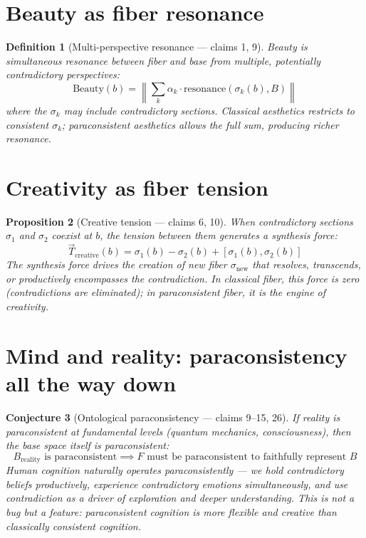 \documentclass[11pt,a4paper]{article}
\newtheorem{definition}{Definition}[section]
\newtheorem{proposition}[definition]{Proposition}
\newtheorem{conjecture}[definition]{Conjecture}
\begin{document}
\section{Beauty as fiber resonance}

\begin{definition}[Multi-perspective resonance --- claims 1, 9]
\emph{Beauty} is simultaneous resonance between fiber and base from
multiple, potentially contradictory perspectives:
\[
  \text{Beauty}(b) = \left\|\sum_k \alpha_k \cdot
    \text{resonance}(\sigma_k(b), B)\right\|
\]
where the $\sigma_k$ may include contradictory sections. Classical
aesthetics restricts to consistent $\sigma_k$; paraconsistent aesthetics
allows the full sum, producing richer resonance.
\end{definition}

\section{Creativity as fiber tension}

\begin{proposition}[Creative tension --- claims 6, 10]
\label{prop:creative}
When contradictory sections $\sigma_1$ and $\sigma_2$ coexist at $b$,
the tension between them generates a synthesis force:
\[
  \vec{T}_{\text{creative}}(b) = \sigma_1(b) - \sigma_2(b) +
    [\sigma_1(b), \sigma_2(b)]
\]
The synthesis force drives the creation of new fiber $\sigma_{\text{new}}$
that resolves, transcends, or productively encompasses the contradiction.
In classical fiber, this force is zero (contradictions are eliminated);
in paraconsistent fiber, it is the engine of creativity.
\end{proposition}


\section{Mind and reality: paraconsistency all the way down}

\begin{conjecture}[Ontological paraconsistency --- claims 9--15, 26]
If reality is paraconsistent at fundamental levels (quantum mechanics,
consciousness), then the base space itself is paraconsistent:
\[
  B_{\text{reality}} \text{ is paraconsistent}
  \implies F \text{ must be paraconsistent to faithfully represent } B
\]
Human cognition naturally operates paraconsistently --- we hold contradictory
beliefs productively, experience contradictory emotions simultaneously,
and use contradiction as a driver of exploration and deeper understanding.
This is not a bug but a feature: paraconsistent cognition is more
flexible and creative than classically consistent cognition.
\end{conjecture}
\end{document}
